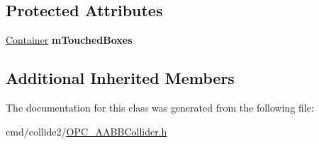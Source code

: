 \subsection*{Protected Attributes}
\begin{DoxyCompactItemize}
\item 
\hyperlink{classContainer}{Container} {\bfseries m\+Touched\+Boxes}\hypertarget{classHybridAABBCollider_a29cebfbfa6395d4f4185acbb10ff1852}{}\label{classHybridAABBCollider_a29cebfbfa6395d4f4185acbb10ff1852}

\end{DoxyCompactItemize}
\subsection*{Additional Inherited Members}


The documentation for this class was generated from the following file\+:\begin{DoxyCompactItemize}
\item 
cmd/collide2/\hyperlink{OPC__AABBCollider_8h}{O\+P\+C\+\_\+\+A\+A\+B\+B\+Collider.\+h}\end{DoxyCompactItemize}
